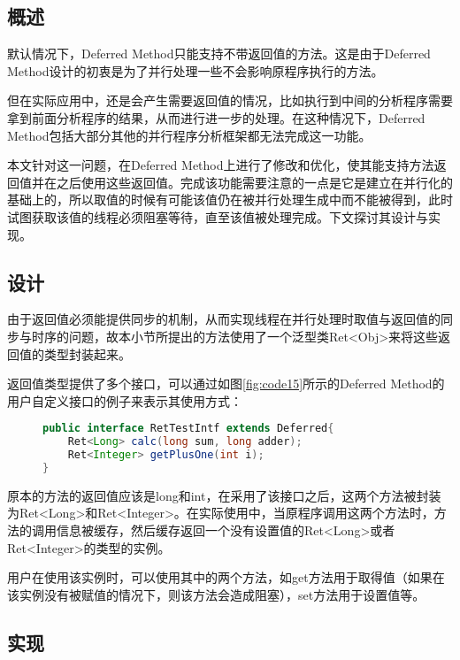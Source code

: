 \subsection{概述}

默认情况下，Deferred Method只能支持不带返回值的方法。这是由于Deferred Method设计的初衷是为了并行处理一些不会影响原程序执行的方法。

但在实际应用中，还是会产生需要返回值的情况，比如执行到中间的分析程序需要拿到前面分析程序的结果，从而进行进一步的处理。在这种情况下，Deferred Method包括大部分其他的并行程序分析框架都无法完成这一功能。

本文针对这一问题，在Deferred Method上进行了修改和优化，使其能支持方法返回值并在之后使用这些返回值。完成该功能需要注意的一点是它是建立在并行化的基础上的，所以取值的时候有可能该值仍在被并行处理生成中而不能被得到，此时试图获取该值的线程必须阻塞等待，直至该值被处理完成。下文探讨其设计与实现。

\subsection{设计}

由于返回值必须能提供同步的机制，从而实现线程在并行处理时取值与返回值的同步与时序的问题，故本小节所提出的方法使用了一个泛型类Ret<Obj>来将这些返回值的类型封装起来。

返回值类型提供了多个接口，可以通过如图\ref{fig:code15}所示的Deferred Method的用户自定义接口的例子来表示其使用方式：

\begin{figure}[!htp]
\begin{lstlisting}[language=Java]
public interface RetTestIntf extends Deferred{ 
	Ret<Long> calc(long sum, long adder);
	Ret<Integer> getPlusOne(int i);
}
\end{lstlisting}
\end{figure}

原本的方法的返回值应该是long和int，在采用了该接口之后，这两个方法被封装为Ret<Long>和Ret<Integer>。在实际使用中，当原程序调用这两个方法时，方法的调用信息被缓存，然后缓存返回一个没有设置值的Ret<Long>或者Ret<Integer>的类型的实例。

用户在使用该实例时，可以使用其中的两个方法，如get方法用于取得值（如果在该实例没有被赋值的情况下，则该方法会造成阻塞），set方法用于设置值等。

\subsection{实现}

